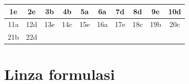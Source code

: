 \begin{center}
\begin{tabular}{|c|c|c|c|c|c|c|c|c|c|}
\hline
1e & 2e & 3b & 4b & 5a & 6a & 7d & 8d & 9e & 10d \\
\hline
11a & 12d & 13e & 14c & 15e & 16a & 17e & 18c & 19b & 20c \\
\hline
21b & 22d & & & & & & & & \\
\hline
\end{tabular}
\end{center}













\section{Linza formulasi}
